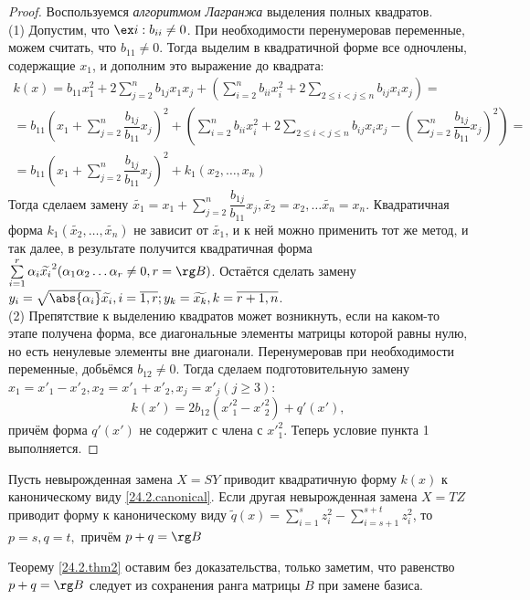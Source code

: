   \begin{proof} Воспользуемся \textit{алгоритмом Лагранжа} выделения полных квадратов.\\
  (1) Допустим,	что $\ex i: b_{ii} \neq 0$. При 	необходимости перенумеровав переменные, можем считать, что $b_{11} \neq 0$. Тогда выделим в квадратичной форме все одночлены, содержащие $x_1$, и дополним это выражение до квадрата:
  \begin{equation*}\begin{array}{crl}
  k(x)=b_{11}x_1^2+2\sum\limits_{j=2}^nb_{1j}x_1x_j+(\sum\limits_{i=2}^nb_{ii}x_i^2+2\sum\limits_{2\le i<j\le n} b_{ij}x_ix_j)=\\
  =b_{11}(x_1+\sum\limits_{j=2}^n\dfrac{b_{1j}}{b_{11}}x_j)^2+(\sum\limits_{i=2}^nb_{ii}x_i^2+2\sum\limits_{2\le i<j\le n} b_{ij}x_ix_j-(\sum\limits_{j=2}^n\dfrac{b_{1j}}{b_{11}}x_j)^2)=\\
  =b_{11}(x_1+\sum\limits_{j=2}^n\dfrac{b_{1j}}{b_{11}}x_j)^2+k_1(x_2,\ldots, x_n)
  \end{array}\end{equation*}
  Тогда сделаем замену $\widetilde{x_1}=x_1+\sum\limits_{j=2}^n\dfrac{b_{1j}}{b_{11}}x_j, \widetilde{x_2}=x_2,\ldots \widetilde{x_n}=x_n$. Квадратичная форма $k_1(\widetilde{x_2},\ldots, \widetilde{x_n})$ не зависит от $\widetilde{x_1}$, и к ней можно применить тот же метод, и так далее, в результате получится квадратичная форма $\sum\limits_{i=1}^r\alpha_i\widetilde{x_i}^2 (\alpha_1\alpha_2\ldots\alpha_r \neq 0, r=\rg B)$. Остаётся сделать замену $y_i=\sqrt{\abs{\alpha_i}}\widetilde{x_i}, i=\overline{1,r}; y_k=\widetilde{x_k}, k=\overline{r+1,n}$.\\
  (2) Препятствие к выделению квадратов может возникнуть, если на каком-то этапе получена форма, все диагональные элементы матрицы которой равны нулю, но есть ненулевые элементы вне диагонали. Перенумеровав при необходимости переменные, добьёмся $b_{12} \neq 0$. Тогда сделаем подготовительную замену $x_1=x'_1-x'_2,x_2=x'_1+x'_2,x_j=x'_j (j \ge 3)$:
  \begin{equation*}
  k(x')=2b_{12}({x'}_1^2-{x'}_2^2)+q'(x'),
  \end{equation*}
  причём форма $q'(x')$ не содержит с члена с ${x'}_1^2$. Теперь условие пункта 1 выполняется.
  \end{proof}
  
  \begin{thm}\label{24.2.thm2}
  Пусть невырожденная замена $X=SY$ приводит квадратичную форму $k(x)$ к каноническому виду \eqref{24.2.canonical}. Если другая невырожденная замена $X=TZ$ приводит форму к каноническому виду $\widetilde q(x)=\sum\limits_{i=1}^sz_i^2-\sum\limits_{i=s+1}^{s+t}z_i^2$, то $p=s,q=t,$ причём $p+q=\rg B$
  \end{thm} 
  Теорему \ref{24.2.thm2} оставим без доказательства, только заметим, что равенство $p+q=\rg B$ следует из сохранения ранга матрицы $B$ при замене базиса.